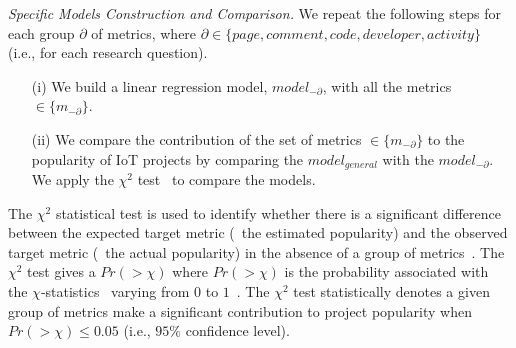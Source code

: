 \vspace{0.1cm}

\noindent\textit{Specific Models Construction and Comparison.}
We repeat the following steps for each group $\partial$ of metrics, where
$\partial\in\{page,comment,code,developer,activity\}$ (i.e., for each research
question).

\begin{enumerate}
	\item[(i)] We build a linear regression model, $model_{-\partial}$, with all the metrics $\in  \{m_{-\partial}\}$.
	\item[(ii)] We compare the contribution of the set of metrics $\in
	\{m_{-\partial}\}$ to the popularity of IoT projects by comparing the
	$model_{general}$ with the $model_{-\partial}$. We apply the $\chi^2$
	test~\cite{satorra2001scaled,pearson1893contributions} to compare the
	models.
\end{enumerate}

The $\chi^2$ statistical test is used to identify whether there is a significant difference between the expected target metric (\eg~the estimated popularity) and the observed target metric (\eg~the actual popularity) in the absence of a group of metrics~\cite{satorra2001scaled,pearson1893contributions}.
The $\chi^2$ test gives a $Pr(>\chi)$ where $Pr(>\chi)$ is the probability associated with the $\chi$-statistics~\cite{rice1989analyzing} varying from $0$ to $1$~\cite{rice1989analyzing}.
The $\chi^2$ test statistically denotes a given group of metrics make a significant contribution to project popularity when $Pr(>\chi)\le 0.05$ (i.e., $95\%$ confidence level).
